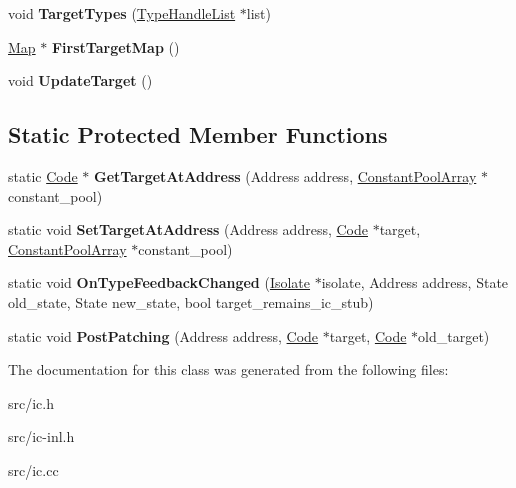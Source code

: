 \begin{DoxyCompactItemize}
\item 
\hypertarget{classv8_1_1internal_1_1_i_c_a73f266c6bb67a2c9253e4420c7940454}{}void {\bfseries Target\+Types} (\hyperlink{classv8_1_1internal_1_1_list}{Type\+Handle\+List} $\ast$list)\label{classv8_1_1internal_1_1_i_c_a73f266c6bb67a2c9253e4420c7940454}

\item 
\hypertarget{classv8_1_1internal_1_1_i_c_ab95e8372477b0f7148a28409e4b51f42}{}\hyperlink{classv8_1_1internal_1_1_map}{Map} $\ast$ {\bfseries First\+Target\+Map} ()\label{classv8_1_1internal_1_1_i_c_ab95e8372477b0f7148a28409e4b51f42}

\item 
\hypertarget{classv8_1_1internal_1_1_i_c_a30f33a0dd8587c23dff46317b0c9f028}{}void {\bfseries Update\+Target} ()\label{classv8_1_1internal_1_1_i_c_a30f33a0dd8587c23dff46317b0c9f028}

\end{DoxyCompactItemize}
\subsection*{Static Protected Member Functions}
\begin{DoxyCompactItemize}
\item 
\hypertarget{classv8_1_1internal_1_1_i_c_a3e6b6951bddfc0d8fe1441fb6c291d13}{}static \hyperlink{classv8_1_1internal_1_1_code}{Code} $\ast$ {\bfseries Get\+Target\+At\+Address} (Address address, \hyperlink{classv8_1_1internal_1_1_constant_pool_array}{Constant\+Pool\+Array} $\ast$constant\+\_\+pool)\label{classv8_1_1internal_1_1_i_c_a3e6b6951bddfc0d8fe1441fb6c291d13}

\item 
\hypertarget{classv8_1_1internal_1_1_i_c_a28ab7f30d8afc3d655e0a851361340f2}{}static void {\bfseries Set\+Target\+At\+Address} (Address address, \hyperlink{classv8_1_1internal_1_1_code}{Code} $\ast$target, \hyperlink{classv8_1_1internal_1_1_constant_pool_array}{Constant\+Pool\+Array} $\ast$constant\+\_\+pool)\label{classv8_1_1internal_1_1_i_c_a28ab7f30d8afc3d655e0a851361340f2}

\item 
\hypertarget{classv8_1_1internal_1_1_i_c_ad947e7475b62f79b20b9a3dbe31a163a}{}static void {\bfseries On\+Type\+Feedback\+Changed} (\hyperlink{classv8_1_1internal_1_1_isolate}{Isolate} $\ast$isolate, Address address, State old\+\_\+state, State new\+\_\+state, bool target\+\_\+remains\+\_\+ic\+\_\+stub)\label{classv8_1_1internal_1_1_i_c_ad947e7475b62f79b20b9a3dbe31a163a}

\item 
\hypertarget{classv8_1_1internal_1_1_i_c_a004c8aba9d7a441b923ec52cdc78c9a0}{}static void {\bfseries Post\+Patching} (Address address, \hyperlink{classv8_1_1internal_1_1_code}{Code} $\ast$target, \hyperlink{classv8_1_1internal_1_1_code}{Code} $\ast$old\+\_\+target)\label{classv8_1_1internal_1_1_i_c_a004c8aba9d7a441b923ec52cdc78c9a0}

\end{DoxyCompactItemize}


The documentation for this class was generated from the following files\+:\begin{DoxyCompactItemize}
\item 
src/ic.\+h\item 
src/ic-\/inl.\+h\item 
src/ic.\+cc\end{DoxyCompactItemize}
